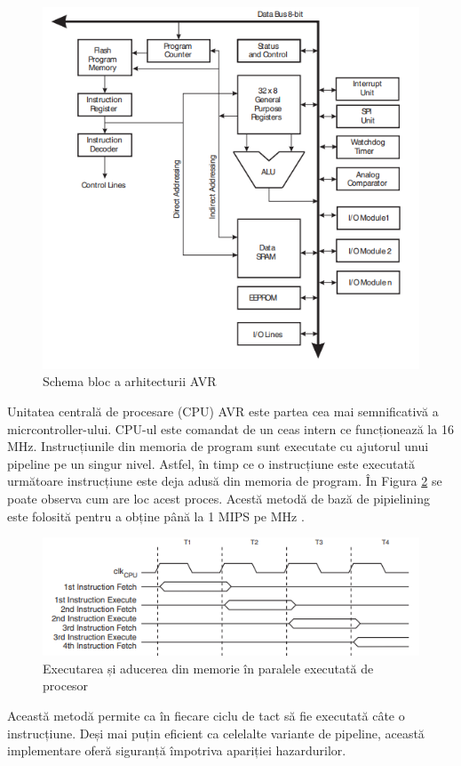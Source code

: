 \begin{figure}[H]
\includegraphics[width=0.6\linewidth]{bachelors_ro/images/arhitectura_avr.png}
\caption{Schema bloc a arhitecturii AVR \cite{avr_atmega2560}}
\label{fig:arhitectura_avr}
\end{figure}

Unitatea centrală de procesare (CPU) AVR este partea cea mai semnificativă a micrcontroller-ului. CPU-ul este comandat de un ceas intern ce funcționează la 16 MHz. Instrucțiunile din memoria de program sunt executate cu ajutorul unui pipeline pe un singur nivel. Astfel, în timp ce o instrucțiune este executată următoare instrucțiune este deja adusă din memoria de program. În Figura \ref{fig:instruction_pipeline} se poate observa cum are loc acest proces. Acestă metodă de bază de pipielining este folosită pentru a obține până la 1 MIPS pe MHz \cite{avr_atmega2560}.

\begin{figure}[H]
\includegraphics{bachelors_ro/images/instruction_pipeline.png}
\caption{Executarea și aducerea din memorie în paralele executată de procesor \cite{avr_atmega2560}}
\label{fig:instruction_pipeline}
\end{figure}

Această metodă permite ca în fiecare ciclu de tact să fie executată câte o instrucțiune\cite{avr_atmega2560}. Deși mai puțin eficient ca celelalte variante de pipeline, această implementare oferă siguranță împotriva apariției hazardurilor.

